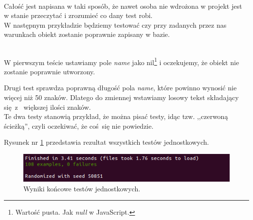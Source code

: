 \begin{code}
	
\end{code}\\

Całość jest napisana w taki sposób, że nawet osoba nie wdrożona w projekt jest w stanie przeczytać i zrozumieć co dany test robi.
\\

W następnym przykładzie będziemy testować czy przy zadanych przez nas warunkach obiekt zostanie poprawnie zapisany w bazie.

\begin{code}
	
\end{code}\\

W pierwszym teście ustawiamy pole \emph{name} jako nil\footnote{Wartość pusta. Jak \emph{null} w JavaScript.} i oczekujemy, że obiekt nie zostanie poprawnie utworzony.

Drugi test sprawdza poprawną długość pola \emph{name}, które powinno wynosić nie więcej niż 50 znaków. Dlatego do zmiennej wstawiamy losowy tekst składający się z~ większej ilości znaków.\\

Te dwa testy stanowią przykład, że można pisać testy, idąc tzw. ,,czerwoną ścieżką'', czyli oczekiwać, że coś się nie powiedzie.

Rysunek nr \ref{fig:all_rspec} przedstawia rezultat wszystkich testów jednostkowych.

\begin{figure}[h]
  \centering
  \includegraphics[scale=0.8]{images/rspec_result.png}
  \caption{Wyniki końcowe testów jednostkowych.}
  \label{fig:all_rspec}
\end{figure}
